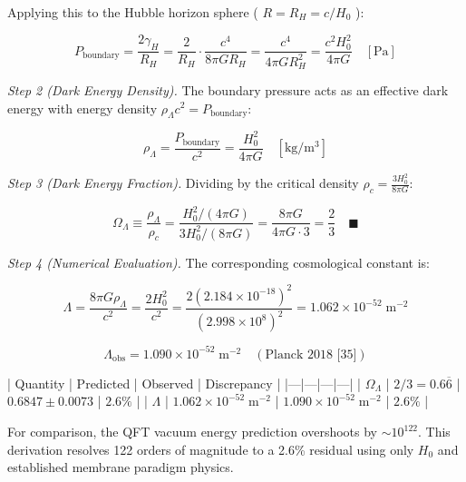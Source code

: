 \documentclass[11pt,a4paper]{article}
\theoremstyle{definition}
\theoremstyle{remark}
\begin{document}
Applying this to the Hubble horizon sphere ( $R = R_H = c/H_0$ ):


\begin{equation}
P_{\text{boundary}} = \frac{2\gamma_H}{R_H} = \frac{2}{R_H} \cdot \frac{c^4}{8\pi G R_H} = \frac{c^4}{4\pi G R_H^2} = \frac{c^2 H_0^2}{4\pi G} \quad [\mathrm{Pa}]
\end{equation}


\textit{Step 2 (Dark Energy Density).} The boundary pressure acts as an effective dark energy with energy density $\rho_\Lambda c^2 = P_{\text{boundary}}$:


\begin{equation}
\rho_\Lambda = \frac{P_{\text{boundary}}}{c^2} = \frac{H_0^2}{4\pi G} \quad [\mathrm{kg/m^3}]
\end{equation}


\textit{Step 3 (Dark Energy Fraction).} Dividing by the critical density $\rho_c = \frac{3 H_0^2}{8\pi G}$:


\begin{equation}
\Omega_\Lambda \equiv \frac{\rho_\Lambda}{\rho_c} = \frac{H_0^2 / (4\pi G)}{3 H_0^2 / (8\pi G)} = \frac{8\pi G}{4\pi G \cdot 3} = \frac{2}{3} \quad \blacksquare
\end{equation}


\textit{Step 4 (Numerical Evaluation).} The corresponding cosmological constant is:


\begin{equation}
\Lambda = \frac{8\pi G \rho_\Lambda}{c^2} = \frac{2 H_0^2}{c^2} = \frac{2 (2.184 \times 10^{-18})^2}{(2.998 \times 10^8)^2} = 1.062 \times 10^{-52} \; \mathrm{m^{-2}}
\end{equation}



\begin{equation}
\Lambda_{\text{obs}} = 1.090 \times 10^{-52} \; \mathrm{m^{-2}} \quad (\text{Planck 2018 [35]})
\end{equation}


| Quantity | Predicted | Observed | Discrepancy |
|---|---|---|---|
| $\Omega_\Lambda$ | $2/3 = 0.6\overline{6}$ | $0.6847 \pm 0.0073$ | $2.6\%$ |
| $\Lambda$ | $1.062 \times 10^{-52} \; \mathrm{m^{-2}}$ | $1.090 \times 10^{-52} \; \mathrm{m^{-2}}$ | $2.6\%$ |

For comparison, the QFT vacuum energy prediction overshoots by $\sim 10^{122}$. This derivation resolves 122 orders of magnitude to a 2.6\% residual using only $H_0$ and established membrane paradigm physics.
\end{document}
